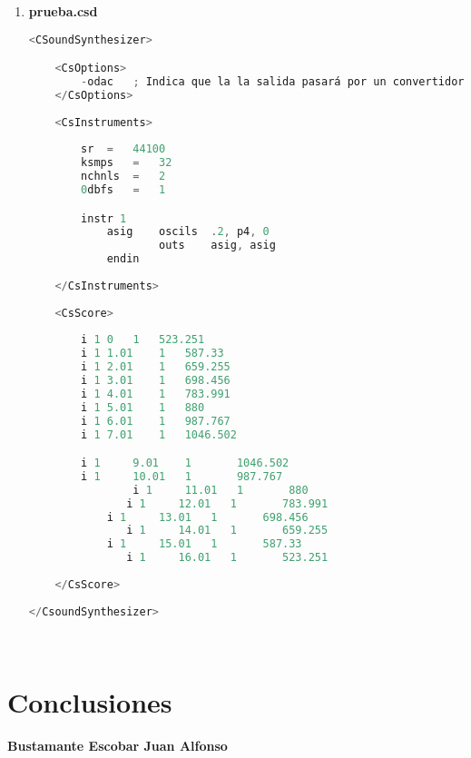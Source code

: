 \documentclass[12pt]{article}
\begin{document}
\begin{enumerate}
\begin{lstlisting}[language=C]
	return 0;
\end{lstlisting}\\

\item {\bf prueba.csd}\\
\begin{lstlisting}[language=C]
<CSoundSynthesizer>

	<CsOptions>
		-odac	; Indica que la la salida pasará por un convertidor Digital-Analógoco (DAC) y será reproducida
	</CsOptions>
	
	<CsInstruments>
	
		sr	=	44100
		ksmps	=	32
		nchnls	=	2
		0dbfs	=	1

		instr 1
			asig    oscils	.2, p4, 0
        			outs    asig, asig
	        endin
	
	</CsInstruments>
	
	<CsScore>
	
		i 1	0	1	523.251
		i 1	1.01	1	587.33
		i 1	2.01	1	659.255
		i 1	3.01	1	698.456
		i 1	4.01	1	783.991
		i 1	5.01	1	880
		i 1	6.01	1	987.767
		i 1	7.01	1	1046.502

		i 1     9.01    1       1046.502
		i 1     10.01   1       987.767
        		i 1     11.01   1       880
	           i 1     12.01   1       783.991
        	i 1     13.01   1       698.456
	           i 1     14.01   1       659.255
        	i 1     15.01   1       587.33
	           i 1     16.01   1       523.251
	
	</CsScore>
	
</CsoundSynthesizer>
\end{lstlisting}\\




\end{enumerate}


\section{Conclusiones}

{\bf Bustamante Escobar Juan Alfonso}
\end{document}
